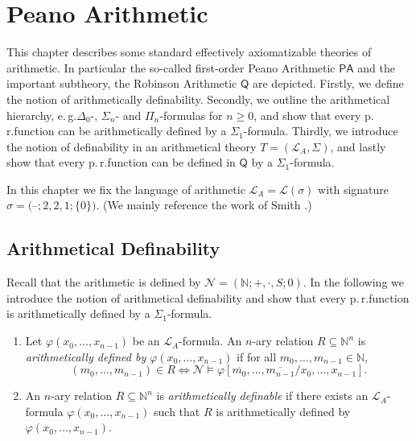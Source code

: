 \chapter{Peano Arithmetic}\label{peano}

This chapter describes some standard effectively axiomatizable theories of arithmetic. In particular the so-called first-order Peano Arithmetic $\mathsf{PA}$ and the important subtheory, the Robinson Arithmetic $\mathsf{Q}$ are depicted. Firstly, we define the notion of arithmetically definability. Secondly, we outline the arithmetical hierarchy, e.\,g.\@ $\Delta_0$-, $\Sigma_n$- and $\Pi_n$-formulas for $n \ge 0$, and show that every p.\,r.\@ function can be arithmetically defined by a $\Sigma_1$-formula. Thirdly, we introduce the notion of definability in an arithmetical theory $T = (\mathcal{L}_A, \Sigma)$, and lastly show that every p.\,r.\@ function can be defined in $\mathsf{Q}$ by a $\Sigma_1$-formula. 

In this chapter we fix the language of arithmetic $\mathcal{L}_A = \mathcal{L}(\sigma)$ with signature $\sigma = ($--$;2,2,1;\lbrace 0 \rbrace)$. (We mainly reference the work of Smith \cite{Smith2009}.)

\section{Arithmetical Definability}
Recall that the arithmetic is defined by $\mathcal{N}=(\mathbb{N}; +, \cdot, S; 0)$. In the following we introduce the notion of arithmetical definability and show that every p.\,r.\@ function is arithmetically defined by a $\Sigma_1$-formula.

\begin{dfn}
\begin{enumerate}
\item Let $\varphi(x_0, \ldots, x_{n-1})$ be an $\mathcal{L}_A$-formula. An $n$-ary relation $R \subseteq \mathbb{N}^n$ is \textit{arithmetically defined by $\varphi(x_0, \ldots, x_{n-1})$} if for all $m_0, \ldots, m_{n-1} \in \mathbb{N}$,
\[(m_0, \ldots, m_{n-1}) \in R \Leftrightarrow \mathcal{N} \vDash \varphi[\overline{m_0}, \ldots, \overline{m_{n-1}}/x_0, \ldots, x_{n-1}]. \]
\item An $n$-ary relation $R \subseteq \mathbb{N}^n$ is \textit{arithmetically definable} if there exists an $\mathcal{L}_A$-formula $\varphi(x_0, \ldots, x_{n-1})$ such that $R$ is arithmetically defined by $\varphi(x_0, \ldots, x_{n-1})$. 

\end{enumerate}
\end{dfn}

